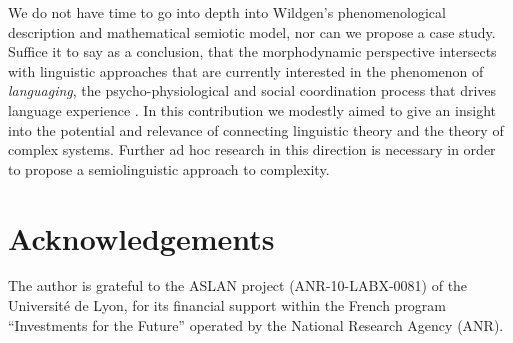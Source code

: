 \documentclass[output=paper]{langscibook}
\begin{document}
We do not have time to go into depth into Wildgen's phenomenological description and mathematical semiotic model, nor can we propose a case study. Suffice it to say as a conclusion, that the morphodynamic perspective intersects with linguistic approaches that are currently interested in the phenomenon of \textit{languaging}, the psycho-physiological and social coordination process that drives language experience \citep{Bottineau2017}. In this contribution we modestly aimed to give an insight into the potential and relevance of connecting linguistic theory and the theory of complex systems. Further ad hoc research in this direction is necessary in order to propose a semiolinguistic approach to complexity. 

\section*{Acknowledgements}
The author is grateful to the ASLAN project (ANR-10-LABX-0081) of the Université de Lyon, for its financial support within the French program “Investments for the Future” operated by the National Research Agency (ANR).

{\sloppy\printbibliography[heading=subbibliography,notkeyword=this]}
\end{document}
